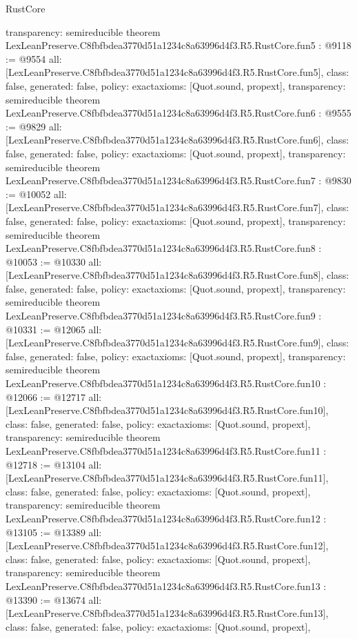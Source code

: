 \begin{lexlean}{RustCore}
\begin{coremodule}
{  transparency: semireducible
}
theorem LexLeanPreserve.C8fbfbdea3770d51a1234c8a63996d4f3.R5.RustCore.fun5 : @9118 := @9554 {
  all: [LexLeanPreserve.C8fbfbdea3770d51a1234c8a63996d4f3.R5.RustCore.fun5],
  class: false,
  generated: false,
  policy: exact{axioms: [Quot.sound, propext]},
  transparency: semireducible
}
theorem LexLeanPreserve.C8fbfbdea3770d51a1234c8a63996d4f3.R5.RustCore.fun6 : @9555 := @9829 {
  all: [LexLeanPreserve.C8fbfbdea3770d51a1234c8a63996d4f3.R5.RustCore.fun6],
  class: false,
  generated: false,
  policy: exact{axioms: [Quot.sound, propext]},
  transparency: semireducible
}
theorem LexLeanPreserve.C8fbfbdea3770d51a1234c8a63996d4f3.R5.RustCore.fun7 : @9830 := @10052 {
  all: [LexLeanPreserve.C8fbfbdea3770d51a1234c8a63996d4f3.R5.RustCore.fun7],
  class: false,
  generated: false,
  policy: exact{axioms: [Quot.sound, propext]},
  transparency: semireducible
}
theorem LexLeanPreserve.C8fbfbdea3770d51a1234c8a63996d4f3.R5.RustCore.fun8 : @10053 := @10330 {
  all: [LexLeanPreserve.C8fbfbdea3770d51a1234c8a63996d4f3.R5.RustCore.fun8],
  class: false,
  generated: false,
  policy: exact{axioms: [Quot.sound, propext]},
  transparency: semireducible
}
theorem LexLeanPreserve.C8fbfbdea3770d51a1234c8a63996d4f3.R5.RustCore.fun9 : @10331 := @12065 {
  all: [LexLeanPreserve.C8fbfbdea3770d51a1234c8a63996d4f3.R5.RustCore.fun9],
  class: false,
  generated: false,
  policy: exact{axioms: [Quot.sound, propext]},
  transparency: semireducible
}
theorem LexLeanPreserve.C8fbfbdea3770d51a1234c8a63996d4f3.R5.RustCore.fun10 : @12066 := @12717 {
  all: [LexLeanPreserve.C8fbfbdea3770d51a1234c8a63996d4f3.R5.RustCore.fun10],
  class: false,
  generated: false,
  policy: exact{axioms: [Quot.sound, propext]},
  transparency: semireducible
}
theorem LexLeanPreserve.C8fbfbdea3770d51a1234c8a63996d4f3.R5.RustCore.fun11 : @12718 := @13104 {
  all: [LexLeanPreserve.C8fbfbdea3770d51a1234c8a63996d4f3.R5.RustCore.fun11],
  class: false,
  generated: false,
  policy: exact{axioms: [Quot.sound, propext]},
  transparency: semireducible
}
theorem LexLeanPreserve.C8fbfbdea3770d51a1234c8a63996d4f3.R5.RustCore.fun12 : @13105 := @13389 {
  all: [LexLeanPreserve.C8fbfbdea3770d51a1234c8a63996d4f3.R5.RustCore.fun12],
  class: false,
  generated: false,
  policy: exact{axioms: [Quot.sound, propext]},
  transparency: semireducible
}
theorem LexLeanPreserve.C8fbfbdea3770d51a1234c8a63996d4f3.R5.RustCore.fun13 : @13390 := @13674 {
  all: [LexLeanPreserve.C8fbfbdea3770d51a1234c8a63996d4f3.R5.RustCore.fun13],
  class: false,
  generated: false,
  policy: exact{axioms: [Quot.sound, propext]},
}
\end{coremodule}
\end{lexlean}
